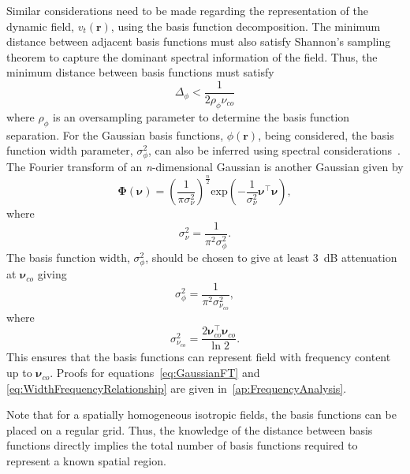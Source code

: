 \documentclass[twocolumn,11pt,a4paper]{article}		%
\begin{document}
Similar considerations need to be made regarding the representation of the dynamic field, $v_t(\mathbf{r})$, using the basis function decomposition. The minimum distance between adjacent basis functions must also satisfy Shannon's sampling theorem to capture the dominant spectral information of the field. Thus, the minimum distance between basis functions must satisfy 
\begin{equation}\label{eq:BasisFunctionSeparation}
	\Delta_{\phi} < \frac{1}{2\rho_{\phi}\nu_{co}}
\end{equation}
where $\rho_{\phi}$ is an oversampling parameter to determine the basis function separation. For the Gaussian basis functions, $\phi(\mathbf{r})$, being considered, the basis function width parameter, $\sigma_{\phi}^2$, can also be inferred using spectral considerations~\cite{Sanner1992,Scerri2009}. The Fourier transform of an \textit{n}-dimensional Gaussian is another Gaussian given by
\begin{equation}\label{eq:GaussianFT}
\boldsymbol\Phi(\boldsymbol \nu)=\left(\frac{1}{\pi\sigma_{\nu}^2}\right)^{\frac{n}{2}}\mathrm{exp}\left(-\frac{1}{\sigma_{\nu}^2}\boldsymbol\nu^\top \boldsymbol\nu\right),
\end{equation}
where 
\begin{equation}\label{eq:GaussianFTWidth}
	\sigma^2_{\nu} = \frac{1}{\pi^2\sigma_{\phi}^2}. 
\end{equation}
The basis function width, $\sigma^2_{\phi}$, should be chosen to give at least 3~dB attenuation at $\boldsymbol\nu_{co}$ giving
\begin{equation}\label{eq:WidthCutOffRelationship}
 \sigma^2_{\phi}= \frac{1}{\pi^2\sigma_{\nu_{co}}^2},
\end{equation}
where
\begin{equation}\label{eq:WidthFrequencyRelationship}
 \sigma^2_{\nu_{co}}= \frac{2\boldsymbol\nu_{co}^\top \boldsymbol\nu_{co}}{\ln 2}.
\end{equation}
This ensures that the basis functions can represent field with frequency content up to $\boldsymbol\nu_{co}$. Proofs for equations~\ref{eq:GaussianFT} and \ref{eq:WidthFrequencyRelationship} are given in~\ref{ap:FrequencyAnalysis}.

Note that for a spatially homogeneous isotropic fields, the basis functions can be placed on a regular grid. Thus, the knowledge of the distance between basis functions directly implies the total number of basis functions required to represent a known spatial region.
\end{document}
